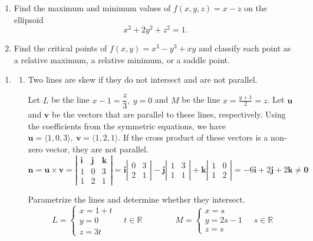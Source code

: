 \documentclass[a4paper, 12pt]{article}
\renewcommand{\headrulewidth}{0pt}
\begin{document}
\begin{enumerate}[leftmargin=*,label=\textbf{\arabic*.}]
\item Find the maximum and minimum values of $f(x,y,z)=x-z$ on the ellipsoid
\[x^2+2y^2+z^2=1.\]

\item Find the critical points of $f(x,y)=x^3-y^3+xy$ and classify each point as a relative maximum, a relative minimum, or a saddle point.
\end{enumerate}

\newpage
\pagestyle{fancy}
\renewcommand{\headrulewidth}{1pt}


\begin{enumerate}[leftmargin=*,label=\textbf{\arabic*.}]
\item
\begin{enumerate}[leftmargin=*,label=\textbf{\alph*.}]
\item \label{item:19_20_spring_midterm_1} Two lines are skew if they do not intersect and are not parallel.

Let $L$ be the line $x-1=\dfrac z3,\: y=0$  and $M$ be the line $\displaystyle x=\frac{y+1}2=z$. Let $\mathbf u$ and $\mathbf v$ be the vectors that are parallel to these lines, respectively. Using the coefficients from the symmetric equations, we have $\mathbf u=\langle1,0,3\rangle, \:\mathbf v= \langle1,2,1\rangle$. If the cross product of these vectors is a non-zero vector, they are not parallel.
\[\mathbf{n}=\mathbf{u}\times\mathbf{v}=\left|\begin{array}{ccc}
\mathbf{i}&\mathbf{j}&\mathbf{k}\\
1&0&3\\
1&2&1
\end{array}\right|=\mathbf{i}\left|\begin{array}{cc}
0&3\\2&1
\end{array}\right|-\mathbf{j}\left|\begin{array}{cc}
1&3\\1&1
\end{array}\right|+\mathbf{k}\left|\begin{array}{cc}
1&0\\1&2
\end{array}\right|=-6\mathbf{i}+2\mathbf{j}+2\mathbf{k}\neq\mathbf{0}\]

Parametrize the lines and determine whether they intersect.
\[L=\left\{\begin{array}{l}
x=1+t\\
y=0\\
z=3t
\end{array}\right.\quad t\in\mathbb{R}\qquad\qquad M=\left\{\begin{array}{l}
x=s\\
y=2s-1\\
z=s
\end{array}\right.\quad s\in\mathbb{R}\]


\end{enumerate}
\end{enumerate}
\end{document}
